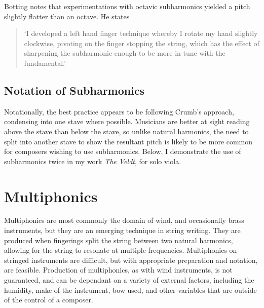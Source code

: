   Botting notes that experimentations with octavic subharmonics yielded a pitch slightly flatter than an octave. He states \begin{quotation}
    `I developed a left hand finger technique whereby I rotate my hand slightly clockwise, pivoting on the finger stopping the string, which has the effect of sharpening the subharmonic enough to be more in tune with the fundamental.'\autocite[111]{bottingDevelopingPersonalVocabulary2019}
\end{quotation}

\subsection{Notation of Subharmonics}
Notationally, the best practice appears to be following Crumb's approach, condensing into one stave where possible. Musicians are better at sight reading above the stave than below the stave, so unlike natural harmonics, the need to split into another stave to show the resultant pitch is likely to be more common for composers wishing to use subharmonics. Below, I demonstrate the use of subharmonics twice in my work \emph{The Veldt}, for solo viola.



\section{Multiphonics}


Multiphonics are most commonly the domain of wind, and occasionally brass instruments, but they are an emerging technique in string writing. They are produced when fingerings split the string between two natural harmonics, allowing for the string to resonate at multiple frequencies.
Multiphonics on stringed instruments are difficult, but with appropriate preparation and notation, are feasible. Production of multiphonics, as with wind instruments, is not guaranteed, and can be dependant on a variety of external factors, including the humidity, make of the instrument, bow used, and other variables that are outside of the control of a composer. 

